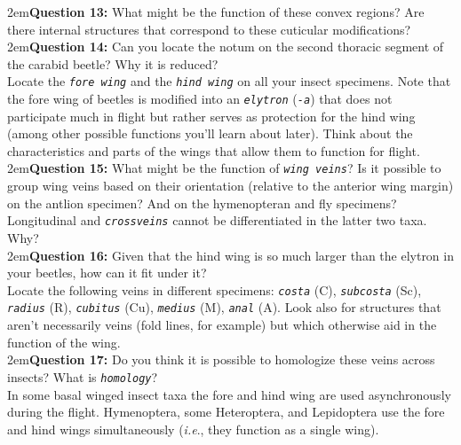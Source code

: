 \documentclass[letterpaper, 11pt]{article}
\newcommand{\latinword}[1]{\texttt{\itshape #1}}%
\begin{document}
\hangindent2em\textbf{Question 13:} What might be the function of these convex regions? Are there internal structures that correspond to these cuticular modifications?\\

\hangindent2em\textbf{Question 14:} Can you locate the notum on the second thoracic segment of the carabid beetle? Why it is reduced?\\

\noindent{}Locate the \latinword{fore wing} and the \latinword{hind wing} on all your insect specimens. Note that the fore wing of beetles is modified into an \latinword{elytron} (\latinword{-a}) that does not participate much in flight but rather serves as protection for the hind wing (among other possible functions you'll learn about later). Think about the characteristics and parts of the wings that allow them to function for flight. \\

\hangindent2em\textbf{Question 15:} What might be the function of \latinword{wing veins}? Is it possible to group wing veins based on their orientation (relative to the anterior wing margin) on the antlion specimen? And on the hymenopteran and fly specimens? Longitudinal and \latinword{crossveins} cannot be differentiated in the latter two taxa. Why? \\

\hangindent2em\textbf{Question 16:} Given that the hind wing is so much larger than the elytron in your beetles, how can it fit under it?\\

\noindent{}Locate the following veins in different specimens: \latinword{costa} (C), \latinword{subcosta} (Sc), \latinword{radius} (R), \latinword{cubitus} (Cu), \latinword{medius} (M), \latinword{anal} (A). Look also for structures that aren't necessarily veins (fold lines, for example) but which otherwise aid in the function of the wing.\\

\hangindent2em\textbf{Question 17:} Do you think it is possible to homologize these veins across insects? What is \latinword{homology}?\\

\noindent{}In some basal winged insect taxa the fore and hind wing are used asynchronously during the flight. Hymenoptera, some Heteroptera, and Lepidoptera use the fore and hind wings simultaneously (\textit{i.e}., they function as a single wing). \\ 
\end{document}
